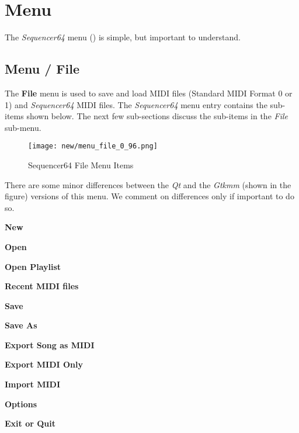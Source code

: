 %
%
%

\section{Menu}
\label{sec:seq64_menu}

   The \textsl{Sequencer64} menu
   () is simple, but important to
   understand.

\subsection{Menu / File}
\label{subsec:seq64_menu_file}

   The \textbf{File} menu is used to save and load MIDI files
   (Standard MIDI Format 0 or 1) and \textsl{Sequencer64} MIDI
   files.
   The \textsl{Sequencer64} menu entry contains the sub-items shown below.
   The next few sub-sections discuss
   the sub-items in the \textsl{File} sub-menu.

\begin{figure}[H]
   \centering 
   \texttt{[image: new/menu\_file\_0\_96.png]}
   \caption{Sequencer64 File Menu Items}
   \label{fig:seq64_menu_file_items}
\end{figure}

   There are some minor differences between the \textsl{Qt} and
   the \textsl{Gtkmm} (shown in the figure) versions of this menu.
   We comment on differences only if important to do so.

   \begin{enumber}
      \item \textbf{New}
      \item \textbf{Open}
      \item \textbf{Open Playlist}
      \item \textbf{Recent MIDI files}
      \item \textbf{Save}
      \item \textbf{Save As}
      \item \textbf{Export Song as MIDI}
      \item \textbf{Export MIDI Only}
      \item \textbf{Import MIDI}
      \item \textbf{Options}
      \item \textbf{Exit or Quit}
   \end{enumber}


